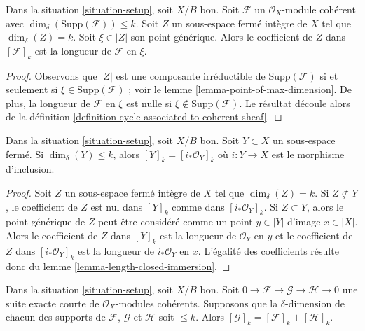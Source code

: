 \begin{lemma}
\label{lemma-reformulate-coeff-coherent}
Dans la situation \ref{situation-setup}, soit $X/B$ bon. Soit
$\mathcal{F}$ un $\mathcal{O}_X$-module cohérent avec
$\dim_\delta(\text{Supp}(\mathcal{F})) \leq k$. Soit $Z$ un sous-espace fermé
intègre de $X$ tel que $\dim_\delta(Z) = k$. Soit $\xi \in |Z|$ son point
générique. Alors le coefficient de $Z$ dans $[\mathcal{F}]_k$ est la
longueur de $\mathcal{F}$ en $\xi$.
\end{lemma}

\begin{proof}
Observons que $|Z|$ est une composante irréductible de
$\text{Supp}(\mathcal{F})$ si et seulement si $\xi \in
\text{Supp}(\mathcal{F})$ ; voir le lemme \ref{lemma-point-of-max-dimension}.
De plus, la longueur de $\mathcal{F}$ en $\xi$ est nulle si $\xi \not \in
\text{Supp}(\mathcal{F})$. Le résultat découle alors de la définition
\ref{definition-cycle-associated-to-coherent-sheaf}.
\end{proof}

\begin{lemma}
\label{lemma-cycle-closed-coherent}
Dans la situation \ref{situation-setup}, soit $X/B$ bon. Soit $Y
\subset X$ un sous-espace fermé. Si $\dim_\delta(Y) \leq k$, alors $[Y]_k =
[i_*\mathcal{O}_Y]_k$ où $i : Y \to X$ est le morphisme d'inclusion.
\end{lemma}

\begin{proof}
Soit $Z$ un sous-espace fermé intègre de $X$ tel que $\dim_\delta(Z) = k$. Si $Z
\not \subset Y$, le coefficient de $Z$ est nul dans $[Y]_k$ comme dans
$[i_*\mathcal{O}_Y]_k$. Si $Z \subset Y$, alors le point générique de $Z$ peut
être considéré comme un point $y \in |Y|$ d'image $x \in |X|$. Alors le
coefficient de $Z$ dans $[Y]_k$ est la longueur de $\mathcal{O}_Y$ en $y$ et
le coefficient de $Z$ dans $[i_*\mathcal{O}_Y]_k$ est la longueur de
$i_*\mathcal{O}_Y$ en $x$. L'égalité des coefficients résulte donc du lemme
\ref{lemma-length-closed-immersion}.
\end{proof}

\begin{lemma}
\label{lemma-additivity-sheaf-cycle}
Dans la situation \ref{situation-setup}, soit $X/B$ bon. Soit $0 \to
\mathcal{F} \to \mathcal{G} \to \mathcal{H} \to 0$ une suite exacte courte
de $\mathcal{O}_X$-modules cohérents. Supposons que la $\delta$-dimension de
chacun des supports de $\mathcal{F}$, $\mathcal{G}$ et $\mathcal{H}$ soit
$\leq k$. Alors
$[\mathcal{G}]_k = [\mathcal{F}]_k + [\mathcal{H}]_k$.
\end{lemma}

